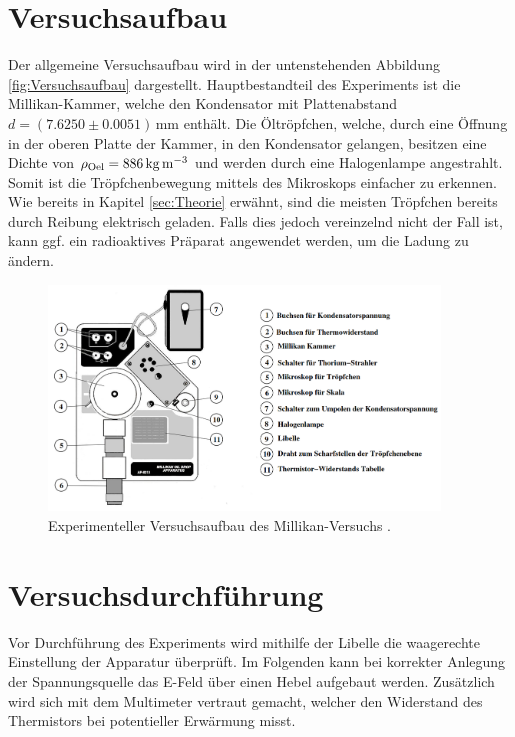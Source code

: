 



\section{Versuchsaufbau}
\label{sec:Versuchsaufbau}

\noindent Der allgemeine Versuchsaufbau wird in der untenstehenden Abbildung \ref{fig:Versuchsaufbau} dargestellt. Hauptbestandteil des Experiments
ist die Millikan-Kammer, welche den Kondensator mit Plattenabstand $d = \left(7.6250\pm0.0051\right)
\,\unit{\milli\meter}$ enthält. Die Öltröpfchen, welche, durch eine Öffnung in der oberen Platte der Kammer,
in den Kondensator gelangen, besitzen eine Dichte von $\rho_\text{Oel}= 886\,\unit[per-mode=reciprocal]{\kilo\gram\per\cubic\meter}$ und 
werden durch eine Halogenlampe angestrahlt. Somit ist die Tröpfchenbewegung mittels des Mikroskops einfacher zu erkennen. Wie bereits 
in Kapitel \ref{sec:Theorie} erwähnt, sind die meisten Tröpfchen bereits durch Reibung elektrisch geladen. Falls dies 
jedoch vereinzelnd nicht der Fall ist, kann ggf. ein radioaktives Präparat angewendet werden, um die Ladung zu ändern.

\begin{figure}
    \centering 
    \includegraphics[height=6cm]{Aufbau.png}
    \caption{Experimenteller Versuchsaufbau des Millikan-Versuchs \cite{Versuchsanleitung_v503}.}
    \label{fig:Aufbau}
\end{figure}

\section{Versuchsdurchführung}
\label{sec:Versuchsdurchführung}

\noindent Vor Durchführung des Experiments wird mithilfe der Libelle die waagerechte Einstellung der Apparatur überprüft. Im 
Folgenden kann bei korrekter Anlegung der Spannungsquelle das E-Feld über einen Hebel aufgebaut werden. Zusätzlich wird sich mit 
dem Multimeter vertraut gemacht, welcher den Widerstand des Thermistors bei potentieller Erwärmung misst.\\

